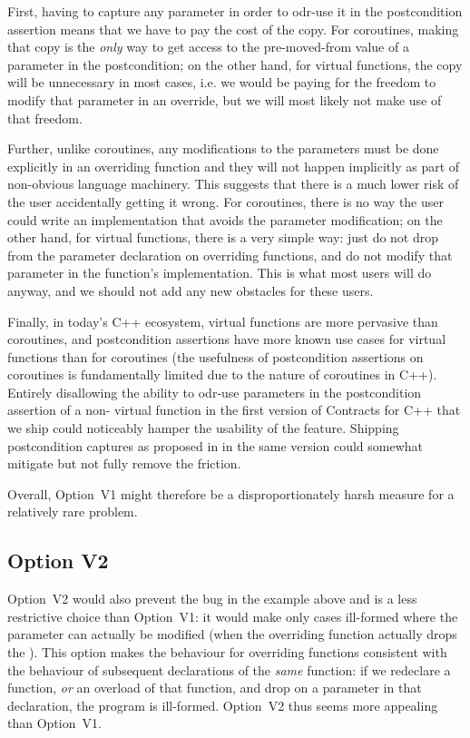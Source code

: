 First, having to capture any parameter in order to odr-use it in the postcondition assertion means that we have to pay the cost of the copy. For coroutines, making that copy is the \emph{only} way to get access to the pre-moved-from value of a parameter in the postcondition; on the other hand, for virtual functions, the copy will be unnecessary in most cases, i.e. we would be paying for the freedom to modify that parameter in an override, but we will most likely not make use of that freedom.

Further, unlike coroutines, any modifications to the parameters must be done explicitly in an overriding function and they will not happen implicitly as part of non-obvious language machinery. This suggests that there is a much lower risk of the user accidentally getting it wrong. For coroutines, there is no way the user could write an implementation that avoids the parameter modification; on the other hand, for virtual functions, there is a very simple way: just do not drop  from the parameter declaration on overriding functions, and do not modify that parameter in the function's implementation. This is what most users will do anyway, and we should not add any new obstacles for these users.

Finally, in today's C++ ecosystem, virtual functions are more pervasive than coroutines, and postcondition assertions have more known use cases for virtual functions than for coroutines (the usefulness of postcondition assertions on coroutines is fundamentally limited due to the nature of coroutines in C++). Entirely disallowing the ability to odr-use parameters in the postcondition assertion of a non- virtual function in the first version of Contracts for C++ that we ship could noticeably hamper the usability of the feature. Shipping postcondition captures as proposed in \cite{P3098R0} in the same version could somewhat mitigate but not fully remove the friction.

Overall, Option~V1 might therefore be a disproportionately harsh measure for a relatively rare problem.

\subsection*{Option V2}

Option~V2 would also prevent the bug in the example above and is a less restrictive choice than Option~V1: it would make only cases ill-formed where the parameter can actually be modified (when the overriding function actually drops the ). This option makes  the behaviour for overriding functions consistent with the behaviour of subsequent declarations of the \emph{same} function: if we redeclare a function, \emph{or} an overload of that function, and drop  on a parameter in that declaration, the program is ill-formed. Option~V2 thus seems more appealing than Option~V1.

